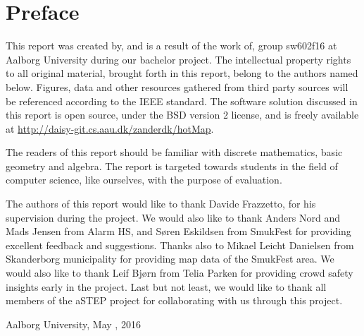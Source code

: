 \chapter*{Preface}\label{ch:preface}
This report was created by, and is a result of the work of, group sw602f16 at Aalborg University during our bachelor project. The intellectual property rights to all original material, brought forth in this report, belong to the authors named below. Figures, data and other resources gathered from third party sources will be referenced according to the IEEE standard. The software solution discussed in this report is open source, under the BSD version 2 license, and is freely available at \url{http://daisy-git.cs.aau.dk/zanderdk/hotMap}.

The readers of this report should be familiar with discrete mathematics, basic geometry and algebra. The report is targeted towards students in the field of computer science, like ourselves, with the purpose of evaluation.

The authors of this report would like to thank Davide Frazzetto, for his supervision during the project. We would also like to thank Anders Nord and Mads Jensen from Alarm HS, and Søren Eskildsen from SmukFest for providing excellent feedback and suggestions. Thanks also to Mikael Leicht Danielsen from Skanderborg municipality for providing map data of the SmukFest area. We would also like to thank Leif Bjørn from Telia Parken for providing crowd safety insights early in the project. Last but not least, we would like to thank all members of the aSTEP project for collaborating with us through this project.

\vspace{\baselineskip}\hfill Aalborg University, May , 2016
\vfill


